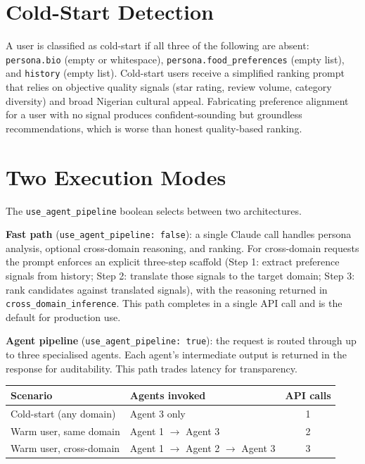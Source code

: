 \documentclass[11pt]{article}
\begin{document}
\section{Cold-Start Detection}

A user is classified as cold-start if all three of the following are absent: \texttt{persona.bio} (empty or whitespace), \texttt{persona.food\_preferences} (empty list), and \texttt{history} (empty list). Cold-start users receive a simplified ranking prompt that relies on objective quality signals (star rating, review volume, category diversity) and broad Nigerian cultural appeal. Fabricating preference alignment for a user with no signal produces confident-sounding but groundless recommendations, which is worse than honest quality-based ranking.

\section{Two Execution Modes}

The \texttt{use\_agent\_pipeline} boolean selects between two architectures.

\textbf{Fast path} (\texttt{use\_agent\_pipeline: false}): a single Claude call handles persona analysis, optional cross-domain reasoning, and ranking. For cross-domain requests the prompt enforces an explicit three-step scaffold (Step 1: extract preference signals from history; Step 2: translate those signals to the target domain; Step 3: rank candidates against translated signals), with the reasoning returned in \texttt{cross\_domain\_inference}. This path completes in a single API call and is the default for production use.

\textbf{Agent pipeline} (\texttt{use\_agent\_pipeline: true}): the request is routed through up to three specialised agents. Each agent's intermediate output is returned in the response for auditability. This path trades latency for transparency.

\begin{table}[h]
\centering
\begin{tabularx}{\textwidth}{lXc}
\toprule
\textbf{Scenario} & \textbf{Agents invoked} & \textbf{API calls} \\
\midrule
Cold-start (any domain) & Agent 3 only & 1 \\
Warm user, same domain & Agent 1 $\rightarrow$ Agent 3 & 2 \\
Warm user, cross-domain & Agent 1 $\rightarrow$ Agent 2 $\rightarrow$ Agent 3 & 3 \\
\bottomrule
\end{tabularx}
\end{table}
\end{document}

